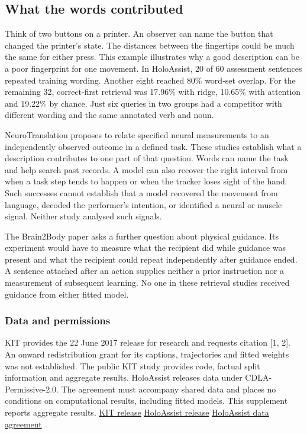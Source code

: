 \subsection*{What the words contributed}

\noindent Think of two buttons on a printer. An observer can name the button that changed the printer's state. The distances between the fingertips could be much the same for either press. This example illustrates why a good description can be a poor fingerprint for one movement. In HoloAssist, 20 of 60 assessment sentences repeated training wording. Another eight reached 80\% word-set overlap. For the remaining 32, correct-first retrieval was 17.96\% with ridge, 10.65\% with attention and 19.22\% by chance. Just six queries in two groups had a competitor with different wording and the same annotated verb and noun.\par

\noindent NeuroTranslation proposes to relate specified neural measurements to an independently observed outcome in a defined task. These studies establish what a description contributes to one part of that question. Words can name the task and help search past records. A model can also recover the right interval from when a task step tends to happen or when the tracker loses sight of the hand. Such successes cannot establish that a model recovered the movement from language, decoded the performer's intention, or identified a neural or muscle signal. Neither study analysed such signals.\par

\noindent The Brain2Body paper asks a further question about physical guidance. Its experiment would have to measure what the recipient did while guidance was present and what the recipient could repeat independently after guidance ended. A sentence attached after an action supplies neither a prior instruction nor a measurement of subsequent learning. No one in these retrieval studies received guidance from either fitted model.\par

\subsubsection*{Data and permissions}

\noindent KIT provides the 22 June 2017 release for research and requests citation [1, 2]. An onward redistribution grant for its captions, trajectories and fitted weights was not established. The public KIT study provides code, factual split information and aggregate results. HoloAssist releases data under CDLA-Permissive-2.0. The agreement must accompany shared data and places no conditions on computational results, including fitted models. This supplement reports aggregate results. \href{https://motion-annotation.humanoids.kit.edu/dataset/}{KIT release} \textperiodcentered{} \href{https://holoassist.github.io/data_links/README.html}{HoloAssist release} \textperiodcentered{} \href{https://cdla.dev/permissive-2-0/}{HoloAssist data agreement}\par

